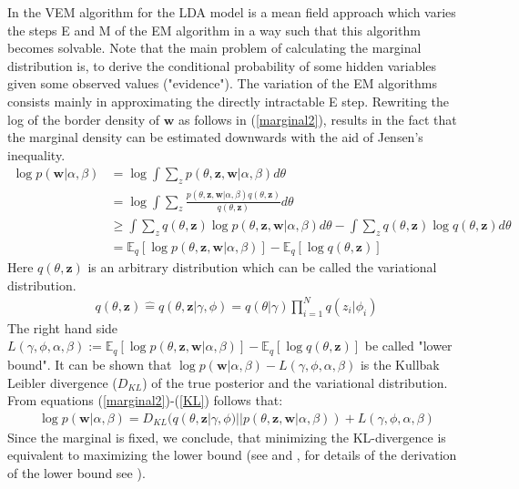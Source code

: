 \documentclass[11pt,a4paper]{article}
\begin{document}
In the VEM algorithm for the LDA model is a mean field approach which varies the steps E and M of the EM algorithm in a way such that this algorithm becomes solvable. Note that the main problem of calculating the marginal distribution is, to derive the conditional probability of some hidden variables given some observed values ("evidence"). The variation of the EM algorithms consists mainly in approximating the directly intractable E step.  Rewriting the log of the border density of $\textbf{w}$ as follows in (\ref{marginal2}), results in the fact that the marginal density can be estimated downwards with the aid of Jensen's inequality.
\begin{align}\label{marginal2}
\log p(\textbf{w}|\alpha, \beta) &= \log \int \sum_{z} 
p(\theta,\textbf{z},\textbf{w}|\alpha,\beta)d\theta\\
& =\log \int \sum_{z} \frac{p(\theta,\textbf{z},\textbf{w}|\alpha,\beta) q(\theta,\textbf{z})}{q(\theta,\textbf{z})}d\theta\\
&\geq \int \sum_{z} q(\theta,\textbf{z})\log p(\theta,\textbf{z},\textbf{w}|\alpha,\beta) d\theta - 
\int \sum_{z} q(\theta,\textbf{z})\log q(\theta,\textbf{z})d\theta\\
&= \mathbb{E}_q[\log p(\theta,\textbf{z},\textbf{w}|\alpha,\beta) ]-
\mathbb{E}_q[\log q(\theta,\textbf{z})] \label{KL}
\end{align}
Here $q(\theta,\textbf{z})$ is an arbitrary distribution which can be called the variational distribution. 
\begin{align}
q(\theta,\textbf{z})\widehat{=}q(\theta,\textbf{z}|\gamma,\phi)
=q(\theta|\gamma) \prod_{i=1}^N q(z_i|\phi_i)
\end{align}
The right hand side $L(\gamma,\phi,\alpha, \beta):=\mathbb{E}_q[\log p(\theta,\textbf{z},\textbf{w}|\alpha,\beta) ]-
\mathbb{E}_q[\log q(\theta,\textbf{z})]$ be called "lower bound". It can be shown that $\log p(\textbf{w}|\alpha, \beta) - L(\gamma,\phi,\alpha, \beta)$ is the Kullbak Leibler divergence ($D_{KL}$) of the true posterior and the variational distribution. From equations (\ref{marginal2})-(\ref{KL}) follows that:
\begin{align}\label{equality}
\log p(\textbf{w}|\alpha, \beta)= D_{KL}(q(\theta,\textbf{z}|\gamma,\phi)||p(\theta,\textbf{z},\textbf{w}|\alpha,\beta)) + L(\gamma,\phi,\alpha, \beta)
\end{align}
Since the marginal is fixed, we conclude, that minimizing the KL-divergence is equivalent to maximizing the lower bound (see \cite{Jordan1999} and \cite{Wainwright2008}, for details of the derivation of the lower bound see \cite{Blei2003}).
\end{document}
